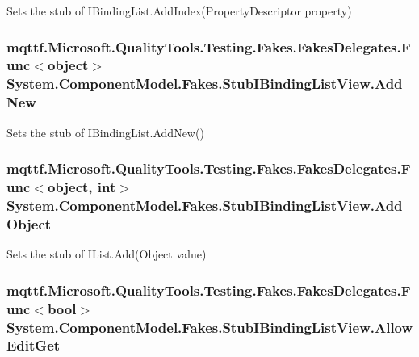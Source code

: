Sets the stub of I\-Binding\-List.\-Add\-Index(\-Property\-Descriptor property)

\hypertarget{class_system_1_1_component_model_1_1_fakes_1_1_stub_i_binding_list_view_a81b950346334350286b3b5737b4b4a1e}{
\subsubsection[{Add\-New}]{\setlength{\rightskip}{0pt plus 5cm}mqttf.\-Microsoft.\-Quality\-Tools.\-Testing.\-Fakes.\-Fakes\-Delegates.\-Func$<$object$>$ System.\-Component\-Model.\-Fakes.\-Stub\-I\-Binding\-List\-View.\-Add\-New}}\label{class_system_1_1_component_model_1_1_fakes_1_1_stub_i_binding_list_view_a81b950346334350286b3b5737b4b4a1e}


Sets the stub of I\-Binding\-List.\-Add\-New()

\hypertarget{class_system_1_1_component_model_1_1_fakes_1_1_stub_i_binding_list_view_ad95ad6959fa46eede04a4308cad75ab2}{
\subsubsection[{Add\-Object}]{\setlength{\rightskip}{0pt plus 5cm}mqttf.\-Microsoft.\-Quality\-Tools.\-Testing.\-Fakes.\-Fakes\-Delegates.\-Func$<$object, int$>$ System.\-Component\-Model.\-Fakes.\-Stub\-I\-Binding\-List\-View.\-Add\-Object}}\label{class_system_1_1_component_model_1_1_fakes_1_1_stub_i_binding_list_view_ad95ad6959fa46eede04a4308cad75ab2}


Sets the stub of I\-List.\-Add(\-Object value)

\hypertarget{class_system_1_1_component_model_1_1_fakes_1_1_stub_i_binding_list_view_ac974b3059c27b9b52ab09f27ba82178f}{
\subsubsection[{Allow\-Edit\-Get}]{\setlength{\rightskip}{0pt plus 5cm}mqttf.\-Microsoft.\-Quality\-Tools.\-Testing.\-Fakes.\-Fakes\-Delegates.\-Func$<$bool$>$ System.\-Component\-Model.\-Fakes.\-Stub\-I\-Binding\-List\-View.\-Allow\-Edit\-Get}}\label{class_system_1_1_component_model_1_1_fakes_1_1_stub_i_binding_list_view_ac974b3059c27b9b52ab09f27ba82178f}


